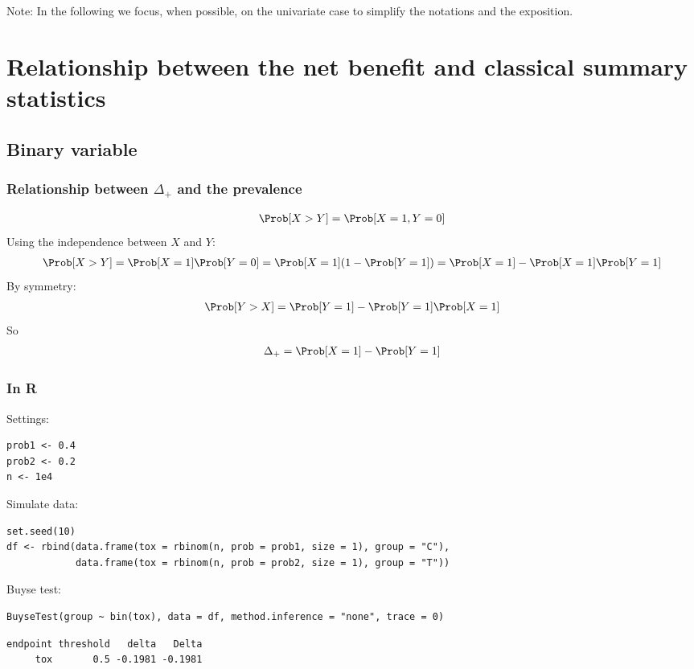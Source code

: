 \documentclass[12pt]{article}
\begin{document}
\bigskip

Note: In the following we focus, when possible, on the univariate case to
simplify the notations and the exposition.

\clearpage

\section{Relationship between the net benefit and classical summary statistics}
\label{sec:org262740e}
\subsection{Binary variable}
\label{sec:orgdb3fd55}
\subsubsection{Relationship between \(\Delta_+\) and the prevalence}
\label{sec:org12019aa}
\begin{align*}
\Prob[X>Y] = \Prob[X=1,Y=0]
\end{align*}
Using the independence between \(X\) and \(Y\):
\begin{align*}
\Prob[X>Y] = \Prob[X=1]\Prob[Y=0] = \Prob[X=1](1-\Prob[Y=1]) = \Prob[X=1] - \Prob[X=1]\Prob[Y=1]
\end{align*}
By symmetry:
\begin{align*}
\Prob[Y>X] = \Prob[Y=1] - \Prob[Y=1]\Prob[X=1]
\end{align*}
So 
\begin{align*}
\Delta_+ = \Prob[X=1] - \Prob[Y=1]
\end{align*}

\subsubsection{In R}
\label{sec:orgd5966f2}
Settings:
\lstset{language=r,label= ,caption= ,captionpos=b,numbers=none}
\begin{lstlisting}
prob1 <- 0.4
prob2 <- 0.2
n <- 1e4
\end{lstlisting}

Simulate data:
\lstset{language=r,label= ,caption= ,captionpos=b,numbers=none}
\begin{lstlisting}
set.seed(10)
df <- rbind(data.frame(tox = rbinom(n, prob = prob1, size = 1), group = "C"),
			data.frame(tox = rbinom(n, prob = prob2, size = 1), group = "T"))
\end{lstlisting}

Buyse test:
\lstset{language=r,label= ,caption= ,captionpos=b,numbers=none}
\begin{lstlisting}
BuyseTest(group ~ bin(tox), data = df, method.inference = "none", trace = 0)
\end{lstlisting}
\begin{verbatim}
endpoint threshold   delta   Delta
     tox       0.5 -0.1981 -0.1981
\end{verbatim}
\end{document}
